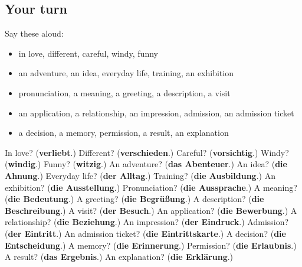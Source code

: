 \subsection*{Your turn}
Say these aloud:

\begin{itemize}
\raggedright
  \item in love, different, careful, windy, funny
  \item an adventure, an idea, everyday life, training, an exhibition
  \item pronunciation, a meaning, a greeting, a description, a visit
  \item an application, a relationship, an impression, admission, an admission ticket
  \item a decision, a memory, permission, a result, an explanation
\end{itemize}

\begin{tcolorbox}[breakable,colback=teal!4,colframe=teal!35!black,title={Before you move on}]
In love? (\textbf{verliebt}.) Different? (\textbf{verschieden}.) Careful? (\textbf{vorsichtig}.) Windy? (\textbf{windig}.) Funny? (\textbf{witzig}.) An adventure? (\textbf{das Abenteuer}.) An idea? (\textbf{die Ahnung}.) Everyday life? (\textbf{der Alltag}.) Training? (\textbf{die Ausbildung}.) An exhibition? (\textbf{die Ausstellung}.) Pronunciation? (\textbf{die Aussprache}.) A meaning? (\textbf{die Bedeutung}.) A greeting? (\textbf{die Begrüßung}.) A description? (\textbf{die Beschreibung}.) A visit? (\textbf{der Besuch}.) An application? (\textbf{die Bewerbung}.) A relationship? (\textbf{die Beziehung}.) An impression? (\textbf{der Eindruck}.) Admission? (\textbf{der Eintritt}.) An admission ticket? (\textbf{die Eintrittskarte}.) A decision? (\textbf{die Entscheidung}.) A memory? (\textbf{die Erinnerung}.) Permission? (\textbf{die Erlaubnis}.) A result? (\textbf{das Ergebnis}.) An explanation? (\textbf{die Erklärung}.)
\end{tcolorbox}
